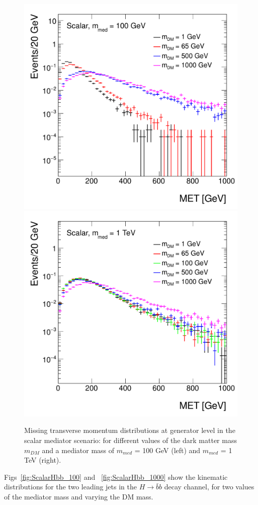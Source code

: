 \begin{figure}[hbpt!]
	\begin{center}
		\includegraphics[width=0.49\linewidth]{figures/EW/monoH/scalar_100_MET_et_Log}
		\includegraphics[width=0.49\linewidth]{figures/EW/monoH/scalar_1000_MET_et_Log}
		\caption{Missing transverse momentum distributions at generator level in the scalar 
			mediator scenario: for different values of the dark matter mass $m_{DM}$ 
			and a mediator mass of $m_{med}$ = 100 GeV (left) and $m_{med}$ = 1 TeV (right).
			\label{fig:metScalarMass}}
	\end{center}
\end{figure}

Figs~\ref{fig:ScalarHbb_100} and ~\ref{fig:ScalarHbb_1000} show the kinematic distributions for the two leading jets
in the $H \to \bar b b$ decay channel, for two values of the mediator mass and varying the DM mass.  

